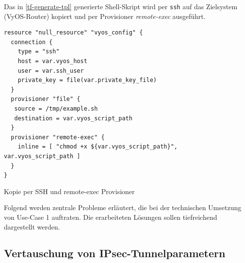 Das in \ref{tf-generate-tpl} generierte Shell-Skript wird per \texttt{ssh} auf das Zielsystem (VyOS-Router) kopiert und per Provisioner \textit{remote-exec} ausgeführt.
\begin{listing}[h]
\begin{verbatim}
resource "null_resource" "vyos_config" {
  connection {
    type = "ssh"
    host = var.vyos_host
    user = var.ssh_user
    private_key = file(var.private_key_file)
  }
  provisioner "file" {
   source = /tmp/example.sh
   destination = var.vyos_script_path
  }
  provisioner "remote-exec" {
    inline = [ "chmod +x ${var.vyos_script_path}", var.vyos_script_path ]
  }
}

\end{verbatim}
\caption{Kopie per SSH und remote-exec Provisioner}
\label{tf-copy-tpl}
\end{listing}\FloatBarrier
\newpage
Folgend werden zentrale Probleme erläutert, die bei der technischen Umsetzung von Use-Case 1 auftraten. Die erarbeiteten Lösungen sollen tiefreichend dargestellt werden.

\newpage
\subsection{Vertauschung von IPsec-Tunnelparametern}\label{xml-tunnel-parameters}

